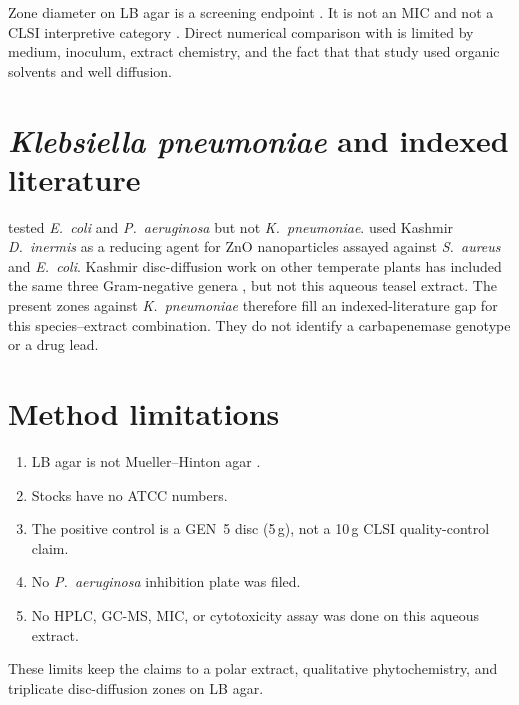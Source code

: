 Zone diameter on LB agar is a screening endpoint \citep{balouiri2016,valgas2007}. It is not an MIC and not a CLSI interpretive category \citep{andrews2001,vanvuuren2019}. Direct numerical comparison with \citet{drakhshaan2026} is limited by medium, inoculum, extract chemistry, and the fact that that study used organic solvents and well diffusion.

\section{\textit{Klebsiella pneumoniae} and indexed literature}
\label{sec:disc_klebsiella}

\citet{drakhshaan2026} tested \textit{E.\ coli} and \textit{P.\ aeruginosa} but not \textit{K.\ pneumoniae}. \citet{ji2026} used Kashmir \textit{D.\ inermis} as a reducing agent for ZnO nanoparticles assayed against \textit{S.\ aureus} and \textit{E.\ coli}. Kashmir disc-diffusion work on other temperate plants has included the same three Gram-negative genera \citep{guna2018,nabi2022}, but not this aqueous teasel extract. The present zones against \textit{K.\ pneumoniae} therefore fill an indexed-literature gap for this species--extract combination. They do not identify a carbapenemase genotype or a drug lead.

\section{Method limitations}
\label{sec:disc_limits}

\begin{enumerate}
  \item LB agar is not Mueller--Hinton agar \citep{clsi2024,balouiri2016}.
  \item Stocks have no ATCC numbers.
  \item The positive control is a GEN~5 disc (5\,\textmu g), not a 10\,\textmu g CLSI quality-control claim.
  \item No \textit{P.\ aeruginosa} inhibition plate was filed.
  \item No HPLC, GC-MS, MIC, or cytotoxicity assay was done on this aqueous extract.
\end{enumerate}

These limits keep the claims to a polar extract, qualitative phytochemistry, and triplicate disc-diffusion zones on LB agar.
